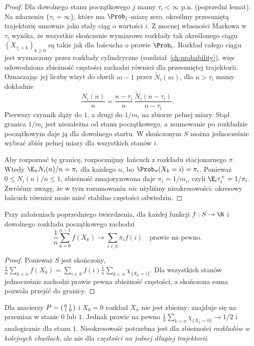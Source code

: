 \begin{proof}
Dla dowolnego stanu początkowego $j$ mamy
$\tau_i<\infty$ p.n. (poprzedni lemat).
Na zdarzeniu $\{\tau_i=\infty\}$, które ma
$\Prob_j$-miarę zero, określmy przesuniętą
trajektorię umownie jako stały ciąg o wartości $i$.
Z mocnej własności Markowa w $\tau_i$ wynika,
że wszystkie skończenie wymiarowe rozkłady
tak określonego ciągu $(X_{\tau_i+k})_{k\geq0}$
są takie jak
dla łańcucha o prawie $\Prob_i$. Rozkład całego
ciągu jest wyznaczony przez rozkłady cylindryczne
(rozdział~\ref{ch:probability}), więc udowodniona
zbieżność częstości zachodzi również dla
przesuniętej trajektorii. Oznaczając jej liczbę
wizyt do chwili $m-1$ przez $\widetilde N_i(m)$,
dla $n>\tau_i$ mamy dokładnie
\[
\frac{N_i(n)}n=
\frac{n-\tau_i}n\,
\frac{\widetilde N_i(n-\tau_i)}{n-\tau_i}.
\]
Pierwszy czynnik dąży do $1$, a drugi do $1/m_i$
na zbiorze pełnej miary. Stąd granica
$1/m_i$ jest niezależna od stanu początkowego,
a zsumowanie po rozkładzie początkowym daje ją
dla dowolnego startu. W skończonym $S$ można
jednocześnie wybrać zbiór pełnej miary dla
wszystkich stanów $i$.

Aby rozpoznać tę granicę, rozpocznijmy łańcuch
z rozkładu stacjonarnego $\pi$. Wtedy
$\E_\pi N_i(n)/n=\pi_i$ dla każdego $n$,
bo $\Prob_\pi(X_k=i)=\pi_i$. Ponieważ
$0\leq N_i(n)/n\leq1$, zbieżność zmajoryzowana
daje $\pi_i=1/m_i$, czyli
$\E_i\tau_i^+=1/\pi_i$. Zwróćmy uwagę,
że w tym rozumowaniu \emph{nie} użyliśmy
nieokresowości: okresowy łańcuch również może
mieć stabilne częstości odwiedzin.
\end{proof}

\begin{wniosek}
Przy założeniach poprzedniego twierdzenia,
dla każdej funkcji $f:S\to\R$ i dowolnego
rozkładu początkowego zachodzi
\[
\frac1n\sum_{k=0}^{n-1}f(X_k)
\longrightarrow\sum_{i\in S}\pi_i f(i)
\quad\text{prawie na pewno}.
\]
\end{wniosek}
\begin{proof}
Ponieważ $S$ jest skończony,
$\frac1n\sum_{k<n}f(X_k)=
\sum_{i\in S}f(i)\frac1n\sum_{k<n}\chi_{\{X_k=i\}}$.
Dla wszystkich stanów jednocześnie zachodzi
prawie pewna zbieżność częstości, a skończona
suma pozwala przejść do granicy.
\end{proof}

\begin{przyklad}
Dla macierzy
$P=\begin{psmallmatrix}0&1\\1&0\end{psmallmatrix}$
i $X_0=0$ rozkład $X_n$ nie jest zbieżny:
znajduje się na przemian w stanie $0$ lub $1$.
Jednak prawie na pewno
$\frac1n\sum_{k<n}\chi_{\{X_k=0\}}\to1/2$
i analogicznie dla stanu $1$. Nieokresowość
potrzebna jest dla zbieżności \emph{rozkładów
w kolejnych chwilach}, ale nie dla \emph{częstości
na jednej długiej trajektorii}.
\end{przyklad}

